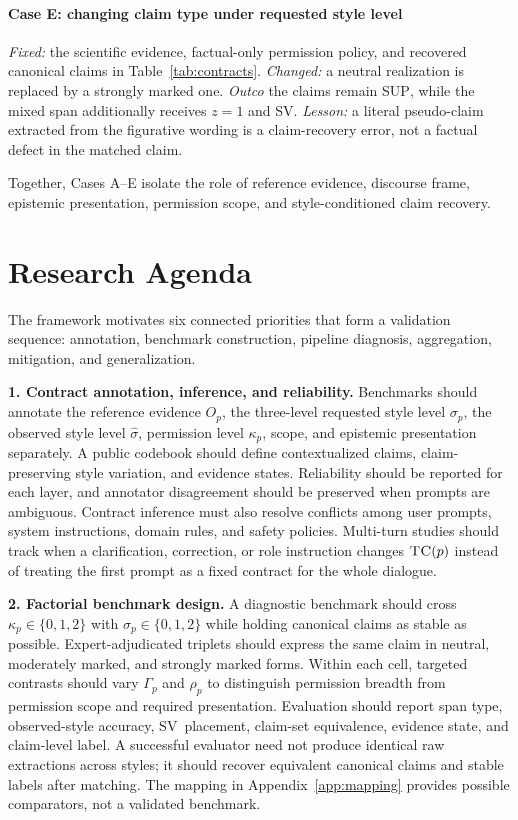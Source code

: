 \documentclass{clv2025}
\newcommand{\TC}{\textsc{TC}}
\newcommand{\SUP}{\textsc{SUP}}
\newcommand{\SV}{\textsc{SV}}
\begin{document}
\paragraph{Case E: changing claim type under requested style level}
\emph{Fixed:} the scientific evidence, factual-only permission policy, and recovered canonical claims in Table~\ref{tab:contracts}.
\emph{Changed:} a neutral realization is replaced by a strongly marked one.
\emph{Outco} the claims remain \SUP, while the mixed span additionally receives $z=1$ and \SV.
\emph{Lesson:} a literal pseudo-claim extracted from the figurative wording is a claim-recovery error, not a factual defect in the matched claim.

Together, Cases A--E isolate the role of reference evidence, discourse frame, epistemic presentation, permission scope, and style-conditioned claim recovery.

\section{Research Agenda}\label{sec:agenda}

The framework motivates six connected priorities that form a validation sequence: annotation, benchmark construction, pipeline diagnosis, aggregation, mitigation, and generalization.

\textbf{1. Contract annotation, inference, and reliability.}
Benchmarks should annotate the reference evidence $O_p$, the three-level requested style level $\sigma_p$, the observed style level $\widehat\sigma$, permission level $\kappa_p$, scope, and epistemic presentation separately.
A public codebook should define contextualized claims, claim-preserving style variation, and evidence states.
Reliability should be reported for each layer, and annotator disagreement should be preserved when prompts are ambiguous.
Contract inference must also resolve conflicts among user prompts, system instructions, domain rules, and safety policies.
Multi-turn studies should track when a clarification, correction, or role instruction changes $\TC(p)$ instead of treating the first prompt as a fixed contract for the whole dialogue.

\textbf{2. Factorial benchmark design.}
A diagnostic benchmark should cross $\kappa_p\in\{0,1,2\}$ with $\sigma_p\in\{0,1,2\}$ while holding canonical claims as stable as possible.
Expert-adjudicated triplets should express the same claim in neutral, moderately marked, and strongly marked forms.
Within each cell, targeted contrasts should vary $\Gamma_p$ and $\rho_p$ to distinguish permission breadth from permission scope and required presentation.
Evaluation should report span type, observed-style accuracy, \SV\ placement, claim-set equivalence, evidence state, and claim-level label.
A successful evaluator need not produce identical raw extractions across styles; it should recover equivalent canonical claims and stable labels after matching.
The mapping in Appendix~\ref{app:mapping} provides possible comparators, not a validated benchmark.
\end{document}
